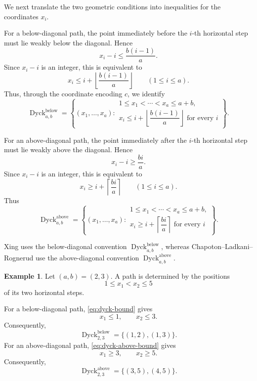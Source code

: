 \documentclass[12pt,a4paper,english,reqno]{amsart}
\theoremstyle{plain}
\theoremstyle{definition}
\newtheorem{exm}[theorem]{Example}
\newcommand{\Dyck}{\operatorname{Dyck}}
\begin{document}
We next translate the two geometric conditions into inequalities for
the coordinates $x_i$.

For a below-diagonal path, the point immediately before the $i$-th
horizontal step must lie weakly below the diagonal. Hence
\[
x_i-i
\leq
\frac{b(i-1)}a.
\]
Since $x_i-i$ is an integer, this is equivalent to
\begin{equation}
x_i
\leq
i+\left\lfloor\frac{b(i-1)}a\right\rfloor
\qquad
(1\leq i\leq a).
\label{eq:dyck-bound}
\end{equation}
Thus, through the coordinate encoding $c$, we identify
\[
\Dyck^{\mathrm{below}}_{a,b}
=
\left\{
(x_1,\ldots,x_a):
\begin{array}{l}
1\leq x_1<\cdots<x_a\leq a+b,\\[2pt]
x_i\leq
i+\left\lfloor\dfrac{b(i-1)}a\right\rfloor
\text{ for every }i
\end{array}
\right\}.
\]

For an above-diagonal path, the point immediately after the $i$-th
horizontal step must lie weakly above the diagonal. Hence
\[
x_i-i
\geq
\frac{bi}{a}.
\]
Since $x_i-i$ is an integer, this is equivalent to
\begin{equation}
x_i
\geq
i+\left\lceil\frac{bi}{a}\right\rceil
\qquad
(1\leq i\leq a).
\label{eq:dyck-above-bound}
\end{equation}
Thus
\[
\Dyck^{\mathrm{above}}_{a,b}
=
\left\{
(x_1,\ldots,x_a):
\begin{array}{l}
1\leq x_1<\cdots<x_a\leq a+b,\\[2pt]
x_i\geq
i+\left\lceil\dfrac{bi}{a}\right\rceil
\text{ for every }i
\end{array}
\right\}.
\]

Xing uses the below-diagonal convention
$\Dyck^{\mathrm{below}}_{a,b}$, whereas
Chapoton--Ladkani--Rognerud use the above-diagonal convention
$\Dyck^{\mathrm{above}}_{a,b}$.

\begin{exm}
Let $(a,b)=(2,3)$. A path is determined by the positions
\[
1\leq x_1<x_2\leq5
\]
of its two horizontal steps.

For a below-diagonal path, \eqref{eq:dyck-bound} gives
\[
x_1\leq1,
\qquad
x_2\leq3.
\]
Consequently,
\[
\Dyck^{\mathrm{below}}_{2,3}
=
\{(1,2),(1,3)\}.
\]
For an above-diagonal path, \eqref{eq:dyck-above-bound} gives
\[
x_1\geq3,
\qquad
x_2\geq5.
\]
Consequently,
\[
\Dyck^{\mathrm{above}}_{2,3}
=
\{(3,5),(4,5)\}.
\]
\end{exm}
\end{document}
